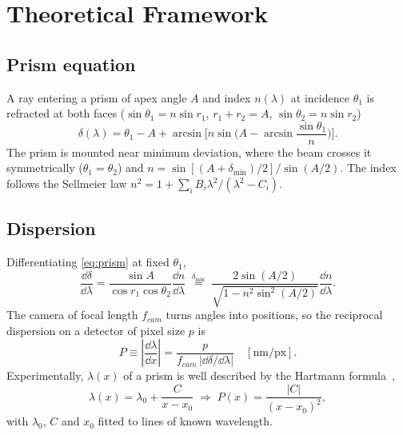 \section{Theoretical Framework}
\label{sec:theory}

\subsection{Prism equation}
A ray entering a prism of apex angle $A$ and index $n(\lambda)$ at incidence $\theta_1$ is refracted at both faces ($\sin\theta_1=n\sin r_1$, $r_1+r_2=A$, $\sin\theta_2=n\sin r_2$)
\begin{equation}
\delta(\lambda)=\theta_1-A+\arcsin\!\Big[n\sin\!\Big(A-\arcsin\frac{\sin\theta_1}{n}\Big)\Big].
\label{eq:prism}
\end{equation}
The prism is mounted near minimum deviation, where the beam crosses it symmetrically ($\theta_1=\theta_2$) and $n=\sin[(A+\delta_{\min})/2]/\sin(A/2)$. The index follows the Sellmeier law $n^2=1+\sum_i B_i\lambda^2/(\lambda^2-C_i)$.

\subsection{Dispersion}
Differentiating \eqref{eq:prism} at fixed $\theta_1$,
\begin{equation}
\frac{\dd\delta}{\dd\lambda}=\frac{\sin A}{\cos r_1\cos\theta_2}\frac{\dd n}{\dd\lambda}
\;\overset{\delta_{\min}}{=}\;
\frac{2\sin(A/2)}{\sqrt{1-n^2\sin^2(A/2)}}\frac{\dd n}{\dd\lambda}.
\label{eq:angdisp}
\end{equation}
The camera of focal length $f_{cam}$ turns angles into positions, so the reciprocal dispersion on a detector of pixel size $p$ is
\begin{equation}
P\equiv\left|\frac{\dd\lambda}{\dd x}\right|=\frac{p}{f_{cam}\,|\dd\delta/\dd\lambda|}\quad[\mathrm{nm/px}].
\label{eq:recip}
\end{equation}
Experimentally, $\lambda(x)$ of a prism is well described by the Hartmann formula~\cite{hartmann},
\begin{equation}
\lambda(x)=\lambda_0+\frac{C}{x-x_0}\;\Rightarrow\;P(x)=\frac{|C|}{(x-x_0)^2},
\label{eq:hartmann}
\end{equation}
with $\lambda_0$, $C$ and $x_0$ fitted to lines of known wavelength.

